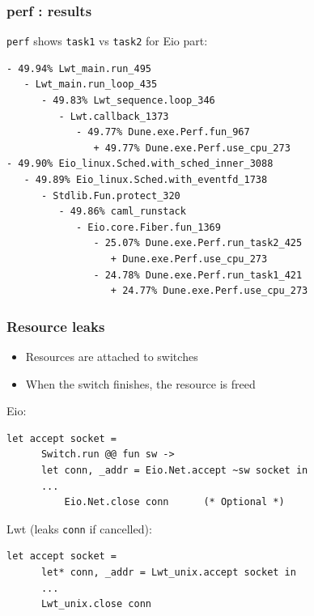 \documentclass{beamer}
\begin{document}
\begin{frame}[fragile]
	\frametitle{perf : results}
        \verb|perf| shows \verb|task1| vs \verb|task2| for Eio part:
	\scriptsize
\begin{verbatim}
- 49.94% Lwt_main.run_495
   - Lwt_main.run_loop_435
      - 49.83% Lwt_sequence.loop_346
         - Lwt.callback_1373
            - 49.77% Dune.exe.Perf.fun_967
               + 49.77% Dune.exe.Perf.use_cpu_273
- 49.90% Eio_linux.Sched.with_sched_inner_3088
   - 49.89% Eio_linux.Sched.with_eventfd_1738
      - Stdlib.Fun.protect_320
         - 49.86% caml_runstack
            - Eio.core.Fiber.fun_1369
               - 25.07% Dune.exe.Perf.run_task2_425
                  + Dune.exe.Perf.use_cpu_273
               - 24.78% Dune.exe.Perf.run_task1_421
                  + 24.77% Dune.exe.Perf.use_cpu_273
\end{verbatim}
\end{frame}

% 

\begin{frame}[fragile]
	\frametitle{Resource leaks}
	\begin{itemize}
		\item Resources are attached to switches
		\item When the switch finishes, the resource is freed
	\end{itemize}
	Eio:
	\begin{lstlisting}[style=ocaml]
	let accept socket =
	  Switch.run @@ fun sw ->
	  let conn, _addr = Eio.Net.accept ~sw socket in
	  ...
          Eio.Net.close conn      (* Optional *)
	\end{lstlisting}
        Lwt (leaks \verb|conn| if cancelled):
	\begin{lstlisting}[style=ocaml]
	let accept socket =
	  let* conn, _addr = Lwt_unix.accept socket in
	  ...
	  Lwt_unix.close conn
	\end{lstlisting}
\end{frame}
\end{document}
